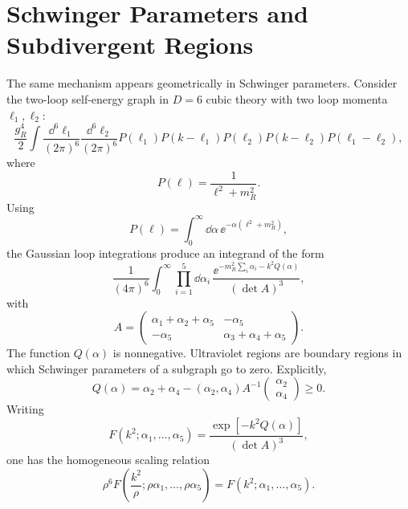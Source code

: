 \section{Schwinger Parameters and Subdivergent Regions}

The same mechanism appears geometrically in Schwinger parameters.  Consider
the two-loop self-energy graph in \(D=6\) cubic theory with two loop momenta
\(\ell_1,\ell_2\):
\[
  \frac{g_R^4}{2}
  \int
  \frac{\dd^6\ell_1}{(2\pi)^6}
  \frac{\dd^6\ell_2}{(2\pi)^6}
  P(\ell_1)P(k-\ell_1)P(\ell_2)P(k-\ell_2)P(\ell_1-\ell_2),
\]
where
\[
  P(\ell)=\frac1{\ell^2+m_R^2}.
\]
Using
\[
  P(\ell)=\int_0^{\infty}\dd\alpha\,
  \ee^{-\alpha(\ell^2+m_R^2)},
\]
the Gaussian loop integrations produce an integrand of the form
\[
  \frac1{(4\pi)^6}
  \int_0^{\infty}
  \prod_{i=1}^{5}\dd\alpha_i\,
  \frac{
    \ee^{-m_R^2\sum_i\alpha_i-k^2 Q(\alpha)}
  }
  {(\det A)^3},
\]
with
\[
  A=
  \begin{pmatrix}
    \alpha_1+\alpha_2+\alpha_5 & -\alpha_5\\
    -\alpha_5 & \alpha_3+\alpha_4+\alpha_5
  \end{pmatrix}.
\]
The function \(Q(\alpha)\) is nonnegative.  Ultraviolet regions are boundary
regions in which Schwinger parameters of a subgraph go to zero.
Explicitly,
\[
  Q(\alpha)
  =
  \alpha_2+\alpha_4
  -
  (\alpha_2,\alpha_4)
  A^{-1}
  \begin{pmatrix}
    \alpha_2\\
    \alpha_4
  \end{pmatrix}
  \ge0 .
\]
Writing
\[
  F(k^2;\alpha_1,\ldots,\alpha_5)
  =
  \frac{\exp[-k^2Q(\alpha)]}{(\det A)^3},
\]
one has the homogeneous scaling relation
\[
  \rho^6
  F\!\left(
    \frac{k^2}{\rho};
    \rho\alpha_1,\ldots,\rho\alpha_5
  \right)
  =
  F(k^2;\alpha_1,\ldots,\alpha_5).
\]

